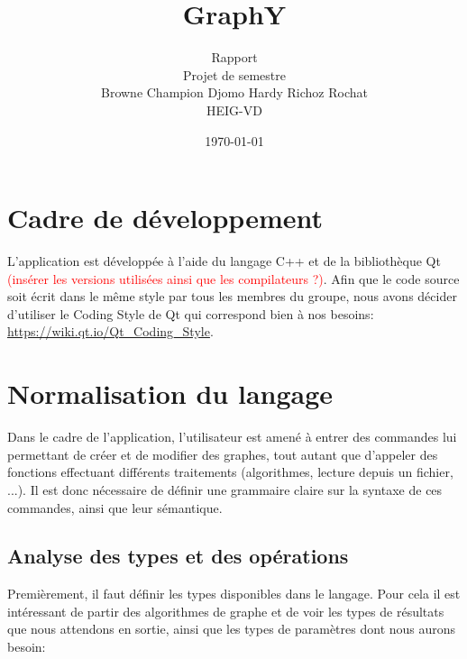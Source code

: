 \documentclass[french]{article}
\begin{document}
	
	\title{GraphY} %
	\author{Rapport\\ 
		Projet de semestre\\
		Browne Champion Djomo Hardy Richoz Rochat\\
		HEIG-VD}
	\date{\today} %
	\maketitle
	
	\tableofcontents
	
	\listoffigures
	
	\justify
	\normalsize
	
	\section{Cadre de développement} %
	L'application est développée à l'aide du langage C++ et de la bibliothèque Qt \textcolor{red}{(insérer les versions utilisées ainsi que les compilateurs ?)}. Afin que le code source soit écrit dans le même style par tous les membres du groupe, nous avons décider d'utiliser le Coding Style de Qt qui correspond bien à nos besoins: \url{https://wiki.qt.io/Qt_Coding_Style}.
	
	\section{Normalisation du langage} %
	Dans le cadre de l'application, l'utilisateur est amené à entrer des commandes lui permettant de créer et de modifier des graphes, tout autant que d'appeler des fonctions effectuant différents traitements (algorithmes, lecture depuis un fichier, ...). Il est donc nécessaire de définir une grammaire claire sur la syntaxe de ces commandes, ainsi que leur sémantique.
	
	\subsection{Analyse des types et des opérations} %
	Premièrement, il faut définir les types disponibles dans le langage. Pour cela il est intéressant de partir des algorithmes de graphe et de voir les types de résultats que nous attendons en sortie, ainsi que les types de paramètres dont nous aurons besoin:
	
\end{document}
